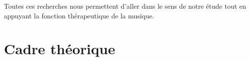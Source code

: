 Toutes ces recherches nous permettent d'aller dans
le sens de notre étude tout en appuyant
la fonction thérapeutique de la musique.








\chapter{Cadre théorique}





